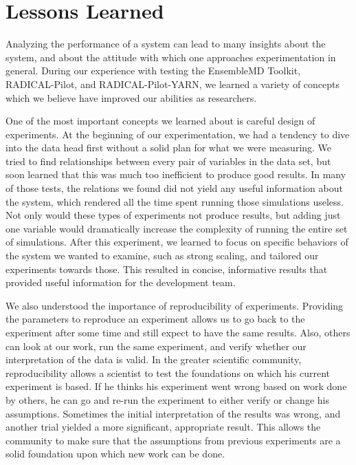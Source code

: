 \documentclass[]{article}
\begin{document}
\section{Lessons Learned}
	Analyzing the performance of a system can lead to many insights about the system, and about the attitude with which one approaches experimentation in general. During our experience with testing the EnsembleMD Toolkit, RADICAL-Pilot, and RADICAL-Pilot-YARN, we learned a variety of concepts which we believe have improved our abilities as researchers.

	One of the most important concepts we learned about is careful design of experiments. At the beginning of our experimentation, we had a tendency to dive into the data head first without a solid plan for what we were measuring. We tried to find relationships between every pair of variables in the data set, but soon learned that this was much too inefficient to produce good results. In many of those tests, the relations we found did not yield any useful information about the system, which rendered all the time spent running those simulations useless. Not only would these types of experiments not produce results, but adding just one variable would dramatically increase the complexity of running the entire set of simulations. After this experiment, we learned to focus on specific behaviors of the system we wanted to examine, such as strong scaling, and tailored our experiments towards those. This resulted in concise, informative results that provided useful information for the development team.

	We also understood the importance of reproducibility of experiments. Providing the parameters to reproduce an experiment allows us to go back to the experiment after some time and still expect to have the same results. Also, others can look at our work, run the same experiment, and verify whether our interpretation of the data is valid. In the greater scientific community, reproducibility allows a scientist to test the foundations on which his current experiment is based. If he thinks his experiment went wrong based on work done by others, he can go and re-run the experiment to either verify or change his assumptions. Sometimes the initial interpretation of the results was wrong, and another trial yielded a more significant, appropriate result. This allows the community to make sure that the assumptions from previous experiments are a solid foundation upon which new work can be done.
\end{document}
